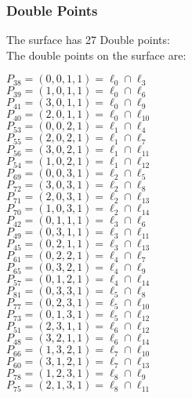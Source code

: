 \documentclass{article}
\begin{document}
{\subsubsection*{Double Points}
The surface has 27 Double points:\\
The double points on the surface are:\\
\begin{multicols}{2}
\noindent
$P_{38} = ( 0, 0, 1, 1 ) = \ell_{0} \cap \ell_{3} $\\
$P_{39} = ( 1, 0, 1, 1 ) = \ell_{0} \cap \ell_{6} $\\
$P_{41} = ( 3, 0, 1, 1 ) = \ell_{0} \cap \ell_{9} $\\
$P_{40} = ( 2, 0, 1, 1 ) = \ell_{0} \cap \ell_{10} $\\
$P_{53} = ( 0, 0, 2, 1 ) = \ell_{1} \cap \ell_{4} $\\
$P_{55} = ( 2, 0, 2, 1 ) = \ell_{1} \cap \ell_{7} $\\
$P_{56} = ( 3, 0, 2, 1 ) = \ell_{1} \cap \ell_{11} $\\
$P_{54} = ( 1, 0, 2, 1 ) = \ell_{1} \cap \ell_{12} $\\
$P_{69} = ( 0, 0, 3, 1 ) = \ell_{2} \cap \ell_{5} $\\
$P_{72} = ( 3, 0, 3, 1 ) = \ell_{2} \cap \ell_{8} $\\
$P_{71} = ( 2, 0, 3, 1 ) = \ell_{2} \cap \ell_{13} $\\
$P_{70} = ( 1, 0, 3, 1 ) = \ell_{2} \cap \ell_{14} $\\
$P_{42} = ( 0, 1, 1, 1 ) = \ell_{3} \cap \ell_{6} $\\
$P_{49} = ( 0, 3, 1, 1 ) = \ell_{3} \cap \ell_{11} $\\
$P_{45} = ( 0, 2, 1, 1 ) = \ell_{3} \cap \ell_{13} $\\
$P_{61} = ( 0, 2, 2, 1 ) = \ell_{4} \cap \ell_{7} $\\
$P_{65} = ( 0, 3, 2, 1 ) = \ell_{4} \cap \ell_{9} $\\
$P_{57} = ( 0, 1, 2, 1 ) = \ell_{4} \cap \ell_{14} $\\
$P_{81} = ( 0, 3, 3, 1 ) = \ell_{5} \cap \ell_{8} $\\
$P_{77} = ( 0, 2, 3, 1 ) = \ell_{5} \cap \ell_{10} $\\
$P_{73} = ( 0, 1, 3, 1 ) = \ell_{5} \cap \ell_{12} $\\
$P_{51} = ( 2, 3, 1, 1 ) = \ell_{6} \cap \ell_{12} $\\
$P_{48} = ( 3, 2, 1, 1 ) = \ell_{6} \cap \ell_{14} $\\
$P_{66} = ( 1, 3, 2, 1 ) = \ell_{7} \cap \ell_{10} $\\
$P_{60} = ( 3, 1, 2, 1 ) = \ell_{7} \cap \ell_{13} $\\
$P_{78} = ( 1, 2, 3, 1 ) = \ell_{8} \cap \ell_{9} $\\
$P_{75} = ( 2, 1, 3, 1 ) = \ell_{8} \cap \ell_{11} $\\
\end{multicols}
}
\end{document}
